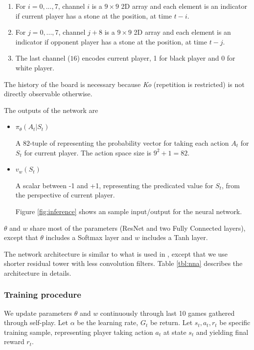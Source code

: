 \documentclass{article}
\begin{document}
\begin{enumerate}
  \item
    For $i = 0, ..., 7$, channel $i$ is a $9 \times 9$ 2D array and each element is an indicator if current player has a stone at the position, at time $t-i$.
  \item
    For $j = 0, ..., 7$, channel $j+8$ is a $9 \times 9$ 2D array and each element is an indicator if opponent player has a stone at the position, at time $t-j$.
  \item
    The last channel ($16$) encodes current player, 1 for black player and 0 for white player.
\end{enumerate}
The history of the board is necessary because \textit{Ko} (repetition is restricted) is not directly observable otherwise.

The outputs of the network are 
\begin{itemize}
  \item
    $\pi_{\theta} (A_t|S_t)$

    A $82$-tuple of representing the probability vector for taking each action $A_t$ for $S_t$ for current player. The action space size is $9 ^2 + 1 = 82$.

  \item
    $v_w(S_t)$

    A scalar between -1 and +1, representing the predicated value for $S_t$, from the perspective of current player.

    Figure \ref{fig:inference} shows an sample input/output for the neural network.
\end{itemize}

$\theta$ and $w$ share most of the parameters (ResNet and two Fully Connected layers), except that $\theta$ includes a Softmax layer and $w$ includes a Tanh layer.

The network architecture is similar to what is used in \cite{silver2017masteringalphagozero}, except that we use shorter residual tower with less convolution filters.  Table \ref{tbl:nna} describes the architecture in details.


\subsubsection{Training procedure}
We update parameters $\theta$ and $w$ continuously through last 10 games gathered through self-play.  Let $\alpha$ be the learning rate,  $G_t$ be return. Let $s_t, a_t, r_t$ be specific training sample, representing player taking action $a_t$ at state $s_t$ and yielding final reward $r_t$.
\end{document}
